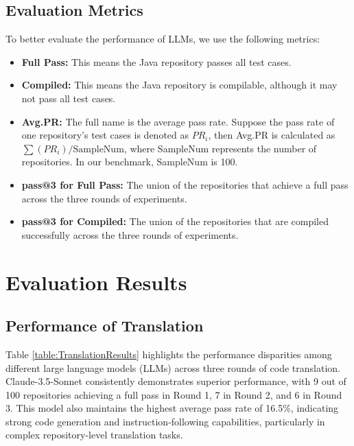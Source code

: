 \subsection{Evaluation Metrics}
To better evaluate the performance of LLMs, we use the following metrics:
\begin{itemize}[left=10pt]
    \item \textbf{Full Pass:} This means the Java repository passes all test cases.
    \item \textbf{Compiled:} This means the Java repository is compilable, although it may not pass all test cases.
    \item \textbf{Avg.PR:} The full name is the average pass rate. Suppose the pass rate of one repository's test cases is denoted as \( PR_i \), then Avg.PR is calculated as \( \sum(PR_i) / \text{SampleNum} \), where SampleNum represents the number of repositories. In our benchmark, SampleNum is 100.
    \item \textbf{pass@3 for Full Pass:} The union of the repositories that achieve a full pass across the three rounds of experiments.
    \item \textbf{pass@3 for Compiled:} The union of the repositories that are compiled successfully across the three rounds of experiments.
\end{itemize}



\section{Evaluation Results}
\subsection{Performance of Translation}  

Table \ref{table:TranslationResults} highlights the performance disparities among different large language models (LLMs) across three rounds of code translation. Claude-3.5-Sonnet consistently demonstrates superior performance, with 9 out of 100 repositories achieving a full pass in Round 1, 7 in Round 2, and 6 in Round 3. This model also maintains the highest average pass rate of 16.5\%, indicating strong code generation and instruction-following capabilities, particularly in complex repository-level translation tasks.

